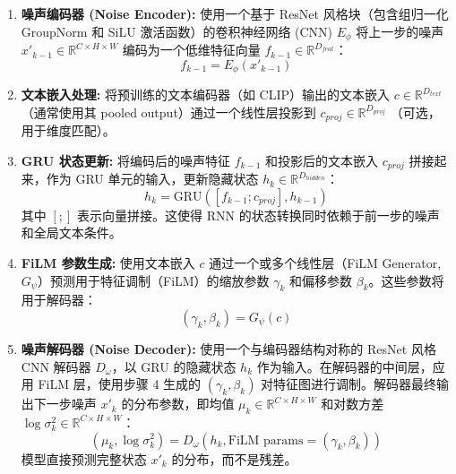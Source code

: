 \documentclass{article}
\begin{document}
\begin{enumerate}
    \item \textbf{噪声编码器 (Noise Encoder):} 使用一个基于 ResNet 风格块（包含组归一化 GroupNorm 和 SiLU 激活函数）的卷积神经网络 (CNN) $E_\phi$ 将上一步的噪声 $x'_{k-1} \in \mathbb{R}^{C \times H \times W}$ 编码为一个低维特征向量 $f_{k-1} \in \mathbb{R}^{D_{feat}}$：
        \begin{equation}
            f_{k-1} = E_\phi(x'_{k-1})
        \end{equation}

    \item \textbf{文本嵌入处理:} 将预训练的文本编码器（如 CLIP）输出的文本嵌入 $c \in \mathbb{R}^{D_{text}}$ （通常使用其 pooled output）通过一个线性层投影到 $c_{proj} \in \mathbb{R}^{D_{proj}}$ （可选，用于维度匹配）。

    \item \textbf{GRU 状态更新:} 将编码后的噪声特征 $f_{k-1}$ 和投影后的文本嵌入 $c_{proj}$ 拼接起来，作为 GRU 单元的输入，更新隐藏状态 $h_k \in \mathbb{R}^{D_{hidden}}$：
        \begin{equation}
            h_k = \text{GRU}( [f_{k-1}; c_{proj}], h_{k-1} )
        \end{equation}
        其中 $[;]$ 表示向量拼接。这使得 RNN 的状态转换同时依赖于前一步的噪声和全局文本条件。

    \item \textbf{FiLM 参数生成:} 使用文本嵌入 $c$ 通过一个或多个线性层（FiLM Generator, $G_\psi$）预测用于特征调制（FiLM）的缩放参数 $\gamma_k$ 和偏移参数 $\beta_k$。这些参数将用于解码器：
        \begin{equation}
            (\gamma_k, \beta_k) = G_\psi(c)
        \end{equation}

    \item \textbf{噪声解码器 (Noise Decoder):} 使用一个与编码器结构对称的 ResNet 风格 CNN 解码器 $D_\omega$，以 GRU 的隐藏状态 $h_k$ 作为输入。在解码器的中间层，应用 FiLM 层，使用步骤 4 生成的 $(\gamma_k, \beta_k)$ 对特征图进行调制。解码器最终输出下一步噪声 $x'_k$ 的分布参数，即均值 $\mu_k \in \mathbb{R}^{C \times H \times W}$ 和对数方差 $\log \sigma^2_k \in \mathbb{R}^{C \times H \times W}$：
        \begin{equation}
            (\mu_k, \log \sigma^2_k) = D_\omega(h_k, \text{FiLM params}=(\gamma_k, \beta_k))
        \end{equation}
        模型直接预测完整状态 $x'_k$ 的分布，而不是残差。

\end{enumerate}
\end{document}
